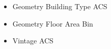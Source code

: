 \begin{itemize}
\item Geometry Building Type ACS
\item Geometry Floor Area Bin
\item Vintage ACS
\end{itemize}
